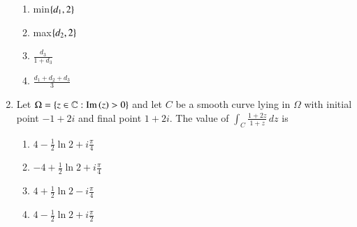 \documentclass[journal]{IEEEtran}
\begin{document}
\begin{enumerate}
\begin{enumerate}
    \item min$\left\{d_1, 2\right\}$
    \item max$\left\{d_2, 2\right\}$
    \item $\frac{d_3}{1+d_3}$
    \item $\frac{d_1+d_2+d_3}{3}$
\end{enumerate}
\item Let $\Omega = \left\{ z \in \mathbb{C} : \text{Im}\left(z\right) > 0 \right\}$ and let $C$ be a smooth curve lying in $\Omega$ with initial point $-1 + 2i$ and final point $1 + 2i$. The value of $\int_C \frac{1 + 2z}{1 + z} \, dz$ is
\begin{enumerate}
    \item $4 - \frac{1}{2} \ln 2 + i \frac{\pi}{4}$
    \item $-4 + \frac{1}{2} \ln 2 + i \frac{\pi}{4}$
    \item $4 + \frac{1}{2} \ln 2 - i \frac{\pi}{4}$
    \item $4 - \frac{1}{2} \ln 2 + i \frac{\pi}{2}$
\end{enumerate}
\end{enumerate}

\end{document}

